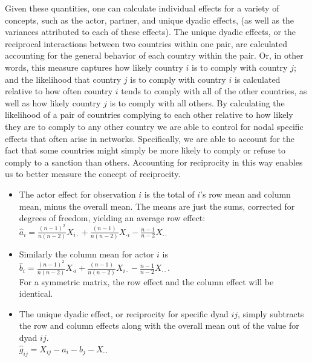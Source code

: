 Given these quantities, one can calculate individual effects for a variety of concepts, such as the actor, partner, and unique dyadic effects, (as well as the variances attributed to each of these effects). The unique dyadic effects, or the reciprocal interactions between two countries within one pair, are calculated accounting for the general behavior of each country within the pair. Or, in other words, this measure captures how likely country $i$ is to comply with country $j$; and the likelihood that country $j$ is to comply with country $i$ is calculated relative to how often country $i$ tends to comply with all of the other countries, as well as how likely country $j$ is to comply with all others. By calculating the likelihood of a pair of countries complying to each other relative to how likely they are to comply to any other country we are able to control for nodal specific effects that often arise in networks. Specifically, we are able to account for the fact that some countries might simply be more likely to comply or refuse to comply to a sanction than others. Accounting for reciprocity in this way enables us to better measure the concept of reciprocity. 

 \begin{itemize}
	 \item The actor effect for observation $i$ is the total of $i$'s row mean and column mean, minus the overall mean.  The means are just the sums, corrected for degrees of freedom, yielding an average row effect:\\
	 $\hat{a}_i = \frac{(n-1)^2}{n(n-2)} X_{i \cdot} + \frac{(n-1)}{n(n-2)} X_{\cdot i} -  \frac{n-1}{n-2} X_{\cdot \cdot} $
	\item Similarly the column mean for actor $i$ is \\
	 $\hat{b}_i = \frac{(n-1)^2}{n(n-2)} X_{\cdot i} + \frac{(n-1)}{n(n-2)} X_{i \cdot } -  \frac{n-1}{n-2} X_{\cdot \cdot} $.\\ For a symmetric matrix, the row effect and the column effect will be identical.
	\item The unique dyadic effect, or reciprocity for specific dyad $ij$, simply subtracts the row and column effects along with the overall mean out of the value for dyad $ij$. \\
	$\hat{g}_{ij} = X_{ij} - \hat{a}_i - \hat{b}_j - X_{\cdot \cdot}$
 \end{itemize}

